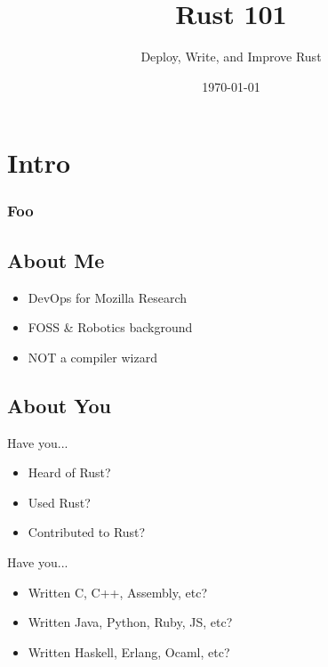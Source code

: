 \documentclass[xcolor={svgnames},hyperref]{beamer}
\title[Rust 101]{Rust 101}
\subtitle{Deploy, Write, and Improve Rust}
\author{\name}
\date{\today}
\begin{document}
\begin{frame}
\titlepage
\end{frame}

\section{Intro}

    \begin{frame}
        \frametitle{Foo}
        \tableofcontents
    \end{frame}


    \subsection{About Me}

    \begin{frame}
        \begin{itemize}
            \item DevOps for Mozilla Research
            \item FOSS \& Robotics background
            \item NOT a compiler wizard
        \end{itemize}
    \end{frame}


    \subsection{About You}

    \begin{frame}
        Have you...
        \begin{itemize}
            \item Heard of Rust?
            \item Used Rust?
            \item Contributed to Rust?
        \end{itemize}
    \end{frame}

    \begin{frame}
        Have you...
        \begin{itemize}
            \item Written C, C++, Assembly, etc?
            \item Written Java, Python, Ruby, JS, etc?
            \item Written Haskell, Erlang, Ocaml, etc?
        \end{itemize}
    \end{frame}
\end{document}
